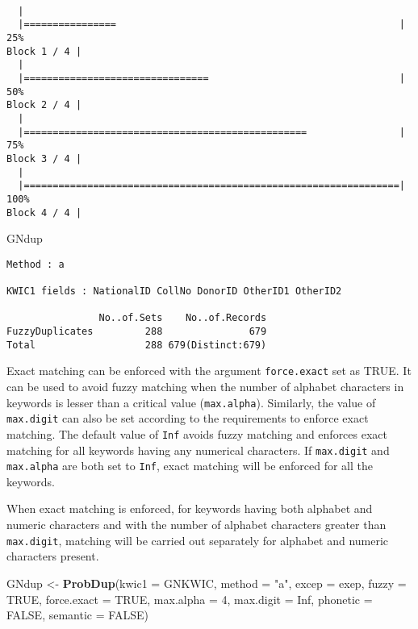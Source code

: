 \documentclass[]{article}
\newenvironment{Shaded}{\begin{snugshade}}{\end{snugshade}}
\newcommand{\DataTypeTok}[1]{\textcolor[rgb]{0.13,0.29,0.53}{#1}}
\newcommand{\DecValTok}[1]{\textcolor[rgb]{0.00,0.00,0.81}{#1}}
\newcommand{\KeywordTok}[1]{\textcolor[rgb]{0.13,0.29,0.53}{\textbf{#1}}}
\newcommand{\NormalTok}[1]{#1}
\newcommand{\OtherTok}[1]{\textcolor[rgb]{0.56,0.35,0.01}{#1}}
\newcommand{\StringTok}[1]{\textcolor[rgb]{0.31,0.60,0.02}{#1}}
\begin{document}
\begin{verbatim}

  |                                                                       
  |================                                                 |  25%
Block 1 / 4 |
  |                                                                       
  |================================                                 |  50%
Block 2 / 4 |
  |                                                                       
  |=================================================                |  75%
Block 3 / 4 |
  |                                                                       
  |=================================================================| 100%
Block 4 / 4 |
\end{verbatim}

\begin{Shaded}
\begin{Highlighting}[]
\NormalTok{GNdup}
\end{Highlighting}
\end{Shaded}

\begin{verbatim}
Method : a

KWIC1 fields : NationalID CollNo DonorID OtherID1 OtherID2
 
                No..of.Sets    No..of.Records
FuzzyDuplicates         288               679
Total                   288 679(Distinct:679)
\end{verbatim}

Exact matching can be enforced with the argument \texttt{force.exact}
set as TRUE. It can be used to avoid fuzzy matching when the number of
alphabet characters in keywords is lesser than a critical value
(\texttt{max.alpha}). Similarly, the value of \texttt{max.digit} can
also be set according to the requirements to enforce exact matching. The
default value of \texttt{Inf} avoids fuzzy matching and enforces exact
matching for all keywords having any numerical characters. If
\texttt{max.digit} and \texttt{max.alpha} are both set to \texttt{Inf},
exact matching will be enforced for all the keywords.

When exact matching is enforced, for keywords having both alphabet and
numeric characters and with the number of alphabet characters greater
than \texttt{max.digit}, matching will be carried out separately for
alphabet and numeric characters present.

\begin{Shaded}
\begin{Highlighting}[]
\NormalTok{GNdup <-}\StringTok{ }\KeywordTok{ProbDup}\NormalTok{(}\DataTypeTok{kwic1 =}\NormalTok{ GNKWIC, }\DataTypeTok{method =} \StringTok{"a"}\NormalTok{, }\DataTypeTok{excep =}\NormalTok{ exep, }
                 \DataTypeTok{fuzzy =} \OtherTok{TRUE}\NormalTok{, }\DataTypeTok{force.exact =} \OtherTok{TRUE}\NormalTok{, }\DataTypeTok{max.alpha =} \DecValTok{4}\NormalTok{, }\DataTypeTok{max.digit =} \OtherTok{Inf}\NormalTok{,}
                 \DataTypeTok{phonetic =} \OtherTok{FALSE}\NormalTok{, }\DataTypeTok{semantic =} \OtherTok{FALSE}\NormalTok{)}
\end{Highlighting}
\end{Shaded}
\end{document}
